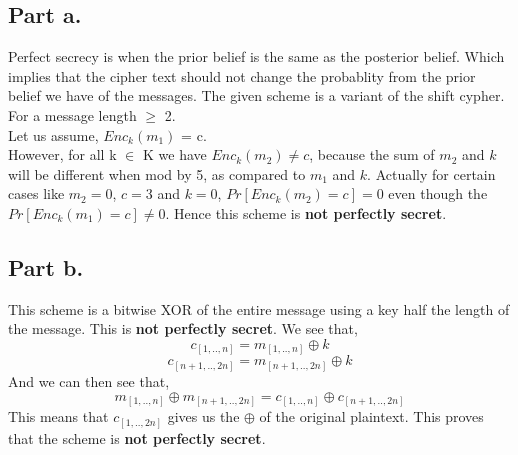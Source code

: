 \documentclass{article}
\begin{document}
        \subsection*{Part a.}
            Perfect secrecy is when the prior belief is the same as the posterior belief. Which implies that the cipher text should not change the probablity from the prior belief we have of the messages.
            The given scheme is a variant of the shift cypher.\\
            For a message length $\geq$ 2.\\
            Let us assume, $Enc_k(m_1)$ = c.\\
            However, for all k $\in$ K we have $Enc_k(m_2) \neq c$, because the sum of $m_2$ and $k$ will be different when mod by 5, as compared to $m_1$ and $k$. Actually for certain cases like $m_2 = 0$, $c = 3$ and $k = 0$, $Pr[Enc_k(m_2) = c] = 0$ even though the $Pr[Enc_k(m_1) = c] \neq 0$.
            Hence this scheme is \textbf{not perfectly secret}.
        \subsection*{Part b.}
            This scheme is a bitwise XOR of the entire message using a key half the length of the message. This is \textbf{not perfectly secret}. We see that,\\
            \[c_{[1,..,n]} = m_{[1,..,n]} \oplus k\]
            \[c_{[n+1,..,2n]} = m_{[n+1,..,2n]} \oplus k\]
            And we can then see that,
            \[m_{[1,..,n]} \oplus m_{[n+1,..,2n]} = c_{[1,..,n]} \oplus c_{[n+1,..,2n]}\]
            This means that $c_{[1,..,2n]}$ gives us the $\oplus$ of the original plaintext. This proves that the scheme is \textbf{not perfectly secret}.
\end{document}
